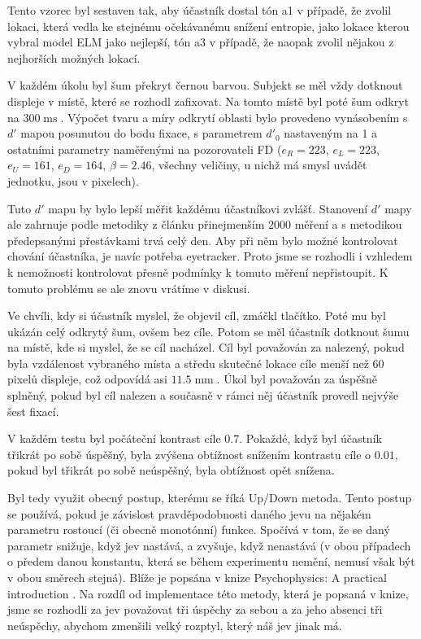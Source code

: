 Tento vzorec byl sestaven tak, aby účastník dostal tón a1 v případě, že zvolil
lokaci, která vedla ke stejnému očekávanému snížení entropie, jako lokace
kterou vybral model ELM jako nejlepší, tón a3 v případě, že naopak zvolil
nějakou z nejhorších možných lokací.

V každém úkolu byl šum překryt černou barvou. Subjekt se měl vždy dotknout
displeje v místě, které se rozhodl zafixovat. Na tomto místě byl poté šum
odkryt na $300 \operatorname{ms}$. Výpočet tvaru a míry odkrytí oblasti bylo
provedeno vynásobením s $d'$ mapou posunutou do bodu fixace, s parametrem
$d'_0$ nastaveným na 1 a ostatními parametry naměřenými na pozorovateli FD
($e_R=223$, $e_L=223$, $e_U = 161$, $e_D = 164$, $\beta=2.46$, všechny
veličiny, u nichž má smysl uvádět jednotku, jsou v pixelech).

Tuto $d'$ mapu by bylo lepší měřit každému účastníkovi
zvlášť. Stanovení $d'$ mapy ale zahrnuje podle metodiky z článku \citep{Ellipse}
přinejmenším 2000 měření a s metodikou předepsanými přestávkami trvá celý den.
Aby při něm bylo možné kontrolovat chování účastníka, je navíc potřeba
eyetracker. Proto jsme se rozhodli i vzhledem k nemožnosti kontrolovat přesně
podmínky k tomuto měření nepřistoupit. K tomuto problému se ale znovu vrátíme
v diskusi.  

Ve chvíli, kdy si účastník myslel, že objevil cíl, zmáčkl tlačítko. Poté mu byl
ukázán celý odkrytý šum, ovšem bez cíle. Potom se měl účastník dotknout šumu na
místě, kde si myslel, že se cíl nacházel. Cíl byl považován za nalezený, pokud
byla vzdálenost vybraného místa a středu skutečné lokace cíle menší než 60
pixelů displeje, což odpovídá asi $11.5 \operatorname{mm}$. Úkol byl považován za úspěšně splněný, pokud byl cíl nalezen a
současně v rámci něj účastník provedl nejvýše šest fixací. 

V každém testu byl počáteční kontrast cíle $0.7$. Pokaždé, když byl účastník
třikrát po sobě úspěšný, byla zvýšena obtížnost snížením kontrastu cíle o
$0.01$, pokud byl třikrát po sobě neúspěšný, byla obtížnost opět snížena. 

Byl tedy využit obecný postup, kterému se říká Up/Down metoda. Tento postup se
používá, pokud je závislost pravděpodobnosti daného jevu na nějakém parametru
rostoucí (či obecně monotónní) funkce. Spočívá v tom, že se daný parametr
snižuje, když jev nastává, a zvyšuje, když nenastává (v obou případech o předem
danou konstantu, která se během experimentu nemění, nemusí však být v obou
směrech stejná). Blíže je popsána v knize Psychophysics: A practical
introduction \citep{psychophysics}.  Na rozdíl od implementace této metody,
která je popsaná v knize, jsme se rozhodli za jev považovat tři úspěchy za
sebou a za jeho absenci tři neúspěchy, abychom zmenšili velký rozptyl, který
náš jev jinak má.

